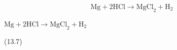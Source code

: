 {\begin{mdframed}[linewidth=4, leftmargin=40, rightmargin=40]
\begin{exercise}
\begin{enumerate}[noitemsep, label=\textbf{Step} \textbf{\arabic*}. ]
{    \begin{equation}
    \mathrm{Mg}+2\mathrm{HCl}\to {\mathrm{MgCl}}_{2}+{\mathrm{H}}_{2}\tag{13.7}
      \end{equation}
    }{%
    \setlength{\mymathboxwidth}{\columnwidth}
      \addtolength{\mymathboxwidth}{-48pt}
    \par\vspace{12pt}\noindent\begin{minipage}{\columnwidth}
    \parbox[t]{\mymathboxwidth}{\large\begin{math}
    \mathrm{Mg}+2\mathrm{HCl}\to {\mathrm{MgCl}}_{2}+{\mathrm{H}}_{2}\end{math}}\hfill
    \parbox[t]{48pt}{\raggedleft 
    (13.7)}
    \end{minipage}\vspace{12pt}\par
    }%
    

\end{enumerate}
\end{exercise}
\end{mdframed}}
